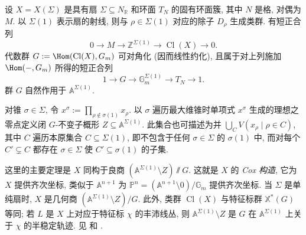 \begin{remark}\label{src:8.5.7}
设 $X=X(\Sigma)$ 是具有扇 $\Sigma\subseteq N_{\mathbb R}$ 和环面 $T_N$ 的固有环面簇, 其中 $N$ 是格, 对偶为 $M$. 以 $\Sigma(1)$ 表示扇的射线, 则与 $\rho\in\Sigma(1)$ 对应的除子 $D_\rho$ 生成类群. 有短正合列
\[
0\longrightarrow M\longrightarrow\mathbb Z^{\Sigma(1)}\longrightarrow\operatorname{Cl}(X)\longrightarrow0.
\]
代数群 $G:=\Hom(\operatorname{Cl}(X),\mathbb G_m)$ 可对角化 (因而线性约化), 且属于对上列施加 $\Hom(-,\mathbb G_m)$ 所得的短正合列
\[
1\longrightarrow G\longrightarrow\mathbb G_m^{\Sigma(1)}\longrightarrow T_N\longrightarrow1.
\]
群 $G$ 自然作用于 $\mathbb A^{\Sigma(1)}$.

对锥 $\sigma\in\Sigma$, 令 $x^\sigma:=\prod_{\rho\notin\sigma(1)}x_\rho$. 以 $\sigma$ 遍历最大维锥时单项式 $x^\sigma$ 生成的理想之零点定义闭 $G$-不变子概形 $Z\subseteq\mathbb A^{\Sigma(1)}$. 此集合也可描述为并 $\bigcup_CV(x_\rho\mid\rho\in C)$, 其中 $C$ 遍历本原集合 $C\subseteq\Sigma(1)$, 即不包含于任何 $\sigma\in\Sigma$ 的 $\sigma(1)$ 中, 而对每个 $C'\subsetneq C$ 都存在 $\sigma\in\Sigma$ 使 $C'\subseteq\sigma(1)$ 的子集.

这里的主要定理是 $X$ 同构于良商 $(\mathbb A^{\Sigma(1)}\setminus Z)\sslash G$. 这就是 $X$ 的 \textit{Cox 构造}, 它为 $X$ 提供齐次坐标, 类似于 $\mathbb A^{n+1}$ 为 $\mathbb P^n=(\mathbb A^{n+1}\setminus0)/\mathbb G_m$ 提供齐次坐标. 当 $\Sigma$ 是单纯扇时, $X$ 是几何商 $(\mathbb A^{\Sigma(1)}\setminus Z)/G$. 此外, 类群 $\operatorname{Cl}(X)$ 与特征标群 $\mathbb X^*(G)$ 等同; 若 $L$ 是 $X$ 上对应于特征标 $\chi$ 的丰沛线丛, 则 $\mathbb A^{\Sigma(1)}\setminus Z$ 是 $G$ 在 $\mathbb A^{\Sigma(1)}$ 上关于 $\chi$ 的半稳定轨迹. 见 \cite{Cox95} 和 \cite[\S5]{CLS11}.
\end{remark}
